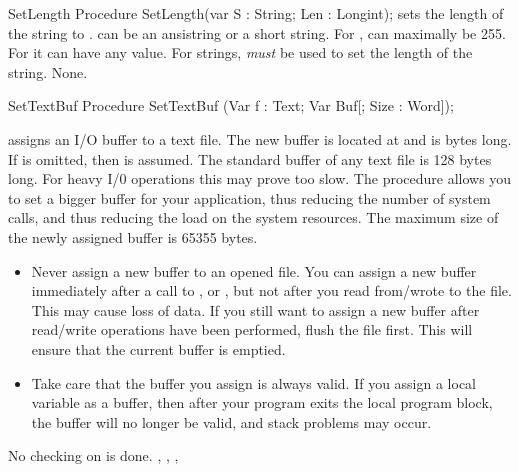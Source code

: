 \documentclass{report}
\begin{document}


\begin{procedure}{SetLength}
\Declaration
Procedure SetLength(var S : String; Len : Longint);
\Description
{} sets the length of the string  to . 
can be an ansistring or a short string. 
For ,  can maximally be 255. For 
it can have any value. For  strings,  {\em
must} be used to set the length of the string.
\Errors
None.
\SeeAlso
{}
\end{procedure}




\begin{procedure}{SetTextBuf}
\Declaration
Procedure SetTextBuf (Var f : Text; Var Buf[; Size : Word]);

\Description
{} assigns an I/O buffer to a text file. The new buffer is
located at  and is  bytes long. If  is omitted,
then  is assumed.
The standard buffer of any text file is 128 bytes long. For heavy I/0
operations this may prove too slow. The  procedure allows
you to set a bigger buffer for your application, thus reducing the number of
system calls, and thus reducing the load on the system resources.
The maximum size of the newly assigned buffer is 65355 bytes.
\begin{remark}
\begin{itemize}
\item Never assign a new buffer to an opened file. You can assign a
new buffer immediately after a call to ,  or
, but not after you read from/wrote to the file. This may cause
loss of data. If you still want to assign a new buffer after read/write
operations have been performed, flush the file first. This will ensure that
the current buffer is emptied.
\item Take care that the buffer you assign is always valid. If you
assign a local variable as a buffer, then after your program exits the local
program block, the buffer will no longer be valid, and stack problems may
occur.
\end{itemize}
\end{remark}
\Errors
No checking on  is done.
\SeeAlso
{}, , , 
\end{procedure}

\end{document}
